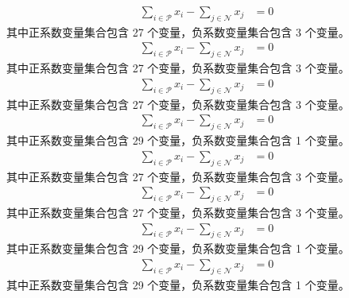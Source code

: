 \documentclass[a4paper,11pt]{article}
\begin{document}
\begin{align}
\sum_{i \in \mathcal{P}} x_i - \sum_{j \in \mathcal{N}} x_j &= 0 \nonumber
\end{align}
其中正系数变量集合包含 27 个变量，负系数变量集合包含 3 个变量。\\[0.3em]

\begin{align}
\sum_{i \in \mathcal{P}} x_i - \sum_{j \in \mathcal{N}} x_j &= 0 \nonumber
\end{align}
其中正系数变量集合包含 27 个变量，负系数变量集合包含 3 个变量。\\[0.3em]

\begin{align}
\sum_{i \in \mathcal{P}} x_i - \sum_{j \in \mathcal{N}} x_j &= 0 \nonumber
\end{align}
其中正系数变量集合包含 27 个变量，负系数变量集合包含 3 个变量。\\[0.3em]

\begin{align}
\sum_{i \in \mathcal{P}} x_i - \sum_{j \in \mathcal{N}} x_j &= 0 \nonumber
\end{align}
其中正系数变量集合包含 29 个变量，负系数变量集合包含 1 个变量。\\[0.3em]

\begin{align}
\sum_{i \in \mathcal{P}} x_i - \sum_{j \in \mathcal{N}} x_j &= 0 \nonumber
\end{align}
其中正系数变量集合包含 27 个变量，负系数变量集合包含 3 个变量。\\[0.3em]

\begin{align}
\sum_{i \in \mathcal{P}} x_i - \sum_{j \in \mathcal{N}} x_j &= 0 \nonumber
\end{align}
其中正系数变量集合包含 27 个变量，负系数变量集合包含 3 个变量。\\[0.3em]

\begin{align}
\sum_{i \in \mathcal{P}} x_i - \sum_{j \in \mathcal{N}} x_j &= 0 \nonumber
\end{align}
其中正系数变量集合包含 29 个变量，负系数变量集合包含 1 个变量。\\[0.3em]

\begin{align}
\sum_{i \in \mathcal{P}} x_i - \sum_{j \in \mathcal{N}} x_j &= 0 \nonumber
\end{align}
其中正系数变量集合包含 29 个变量，负系数变量集合包含 1 个变量。\\[0.3em]
\end{document}
